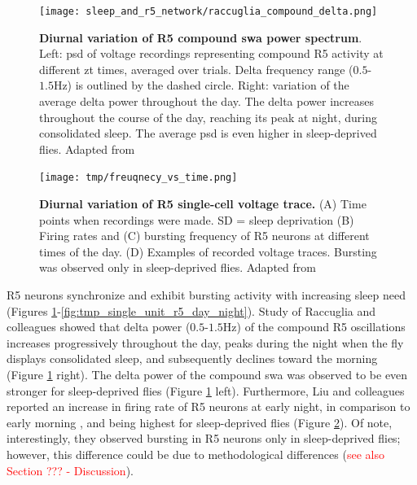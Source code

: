 \documentclass[../main.tex]{subfiles}
\begin{document}
\begin{figure}[!b]
    \centering
    \texttt{[image: sleep\_and\_r5\_network/raccuglia\_compound\_delta.png]}
    \caption[Diurnal variation of R5 compound \gls{swa} power spectrum]{
        \textbf{Diurnal variation of R5 compound \gls{swa} power spectrum}.
        Left: \gls{psd} of voltage recordings representing compound R5 activity at different \gls{zt} times, averaged over trials. Delta frequency range ($0.5$-$1.5$Hz) is outlined by the dashed circle. Right: variation of the average delta power throughout the day. The delta power increases throughout the course of the day, reaching its peak at night, during consolidated sleep. The average \gls{psd} is even higher in sleep-deprived flies.
        Adapted from \cite{raccugliaNetworkSpecificSynchronizationElectrical2019}
    }
    \label{fig:raccuglia_compound_delta_oscillations}
\end{figure}

\begin{figure}[!b]
    \centering
    \texttt{[image: tmp/freuqnecy\_vs\_time.png]}
    \caption[Diurnal variation of R5 single-cell voltage trace.]{
        \textbf{Diurnal variation of R5 single-cell voltage trace.}
        (A) Time points when recordings were made. SD = sleep deprivation (B) Firing rates and (C) bursting frequency of R5 neurons at different times of the day. (D) Examples of recorded voltage traces. Bursting was observed only in sleep-deprived flies. Adapted from \cite{liuSleepDriveEncoded2016}
    }
    \label{fig:tmp_frequency_vs_zt}
\end{figure}

R5 neurons synchronize and exhibit bursting activity with increasing sleep need \cite{raccugliaNetworkSpecificSynchronizationElectrical2019,liuSleepDriveEncoded2016}
(Figures \ref{fig:raccuglia_compound_delta_oscillations}-\ref{fig:tmp_single_unit_r5_day_night}).
Study of Raccuglia and colleagues showed that delta power ($0.5$-$1.5$Hz) of the compound R5 oscillations increases progressively throughout the day, peaks during the night when the fly displays consolidated sleep, and subsequently declines toward the morning \cite{raccugliaNetworkSpecificSynchronizationElectrical2019} (Figure \ref{fig:raccuglia_compound_delta_oscillations} right).
The delta power of the compound \gls{swa} was observed to be even stronger for sleep-deprived flies (Figure \ref{fig:raccuglia_compound_delta_oscillations} left). Furthermore, Liu and colleagues reported an increase in firing rate of R5 neurons at early night, in comparison to early morning \cite{liuSleepDriveEncoded2016}, and being highest for sleep-deprived flies (Figure \ref{fig:tmp_frequency_vs_zt}). Of note, interestingly, they observed bursting in R5 neurons only in sleep-deprived flies; however, this difference could be due to methodological differences (\textcolor{red}{see also Section ??? - Discussion}).
\end{document}
